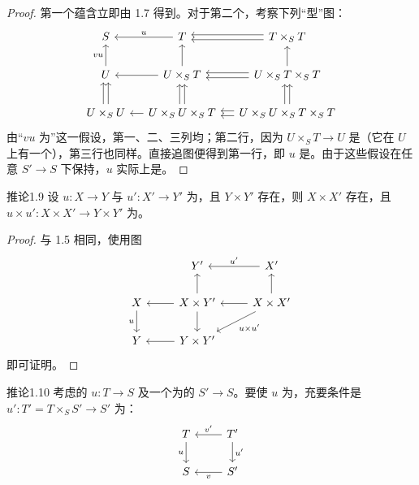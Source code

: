 \begin{proof}
第一个蕴含立即由 1.7 得到。对于第二个，考察下列“型”图：
\[
\begin{tikzcd}[column sep=small]
S&T\arrow[l,"u"']&T\times_S T\arrow[l,shift left=.5ex]\arrow[l,shift right=.5ex]\\
U\arrow[u,"vu"]&U\times_S T\arrow[l]\arrow[u]&U\times_S T\times_S T\arrow[l,shift left=.5ex]\arrow[l,shift right=.5ex]\arrow[u]\\
U\times_S U\arrow[u,shift left=.5ex]\arrow[u,shift right=.5ex]&U\times_S U\times_S T\arrow[l]\arrow[u,shift left=.5ex]\arrow[u,shift right=.5ex]&U\times_S U\times_S T\times_S T\arrow[l,shift left=.5ex]\arrow[l,shift right=.5ex]\arrow[u,shift left=.5ex]\arrow[u,shift right=.5ex]
\end{tikzcd}
\]
由“$vu$ 为”这一假设，第一、二、三列均；第二行，因为 $U\times_S T\to U$ 是（它在 $U$ 上有一个），第三行也同样。直接追图便得到第一行，即 $u$ 是。由于这些假设在任意 $S'\to S$ 下保持，$u$ 实际上是。
\end{proof}
\begin{SGAresult}{推论}{1.9}
设 $u:X\to Y$ 与 $u':X'\to Y'$ 为，且 $Y\times Y'$ 存在，则 $X\times X'$ 存在，且 $u\times u':X\times X'\to Y\times Y'$ 为。
\end{SGAresult}
\begin{proof}
与 1.5 相同，使用图
\[
\begin{tikzcd}
&Y'&X'\arrow[l,"u'"']\\
X\arrow[d,"u"']&X\times Y'\arrow[l]\arrow[u]\arrow[d]&X\times X'\arrow[l]\arrow[u]\arrow[dl,"u\times u'"]\\
Y&Y\times Y'\arrow[l]
\end{tikzcd}
\]
即可证明。
\end{proof}
\begin{SGAresult}{推论}{1.10}
考虑的 $u:T\to S$ 及一个为的 $S'\to S$。要使 $u$ 为，充要条件是 $u':T'=T\times_S S'\to S'$ 为：
\[
\begin{tikzcd}T\arrow[d,"u"']&T'\arrow[l,"v'"']\arrow[d,"u'"]\\S&S'\arrow[l,"v"]\end{tikzcd}
\]
\end{SGAresult}
